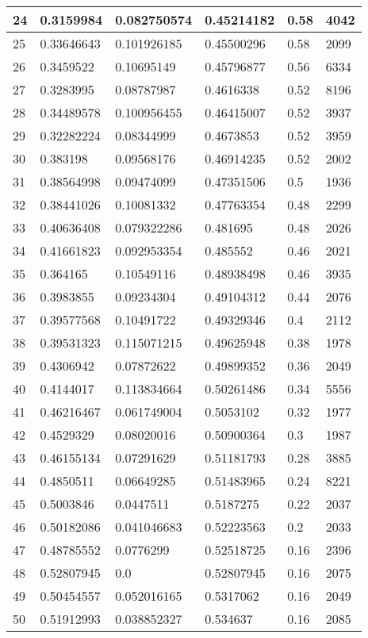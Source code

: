 \begin{longtable}{|l|l|l|l|l|l|}
24 & 0.3159984 & 0.082750574 & 0.45214182 & 0.58 & 4042 \\ \hline 
25 & 0.33646643 & 0.101926185 & 0.45500296 & 0.58 & 2099 \\ \hline 
26 & 0.3459522 & 0.10695149 & 0.45796877 & 0.56 & 6334 \\ \hline 
27 & 0.3283995 & 0.08787987 & 0.4616338 & 0.52 & 8196 \\ \hline 
28 & 0.34489578 & 0.100956455 & 0.46415007 & 0.52 & 3937 \\ \hline 
29 & 0.32282224 & 0.08344999 & 0.4673853 & 0.52 & 3959 \\ \hline 
30 & 0.383198 & 0.09568176 & 0.46914235 & 0.52 & 2002 \\ \hline 
31 & 0.38564998 & 0.09474099 & 0.47351506 & 0.5 & 1936 \\ \hline 
32 & 0.38441026 & 0.10081332 & 0.47763354 & 0.48 & 2299 \\ \hline 
33 & 0.40636408 & 0.079322286 & 0.481695 & 0.48 & 2026 \\ \hline 
34 & 0.41661823 & 0.092953354 & 0.485552 & 0.46 & 2021 \\ \hline 
35 & 0.364165 & 0.10549116 & 0.48938498 & 0.46 & 3935 \\ \hline 
36 & 0.3983855 & 0.09234304 & 0.49104312 & 0.44 & 2076 \\ \hline 
37 & 0.39577568 & 0.10491722 & 0.49329346 & 0.4 & 2112 \\ \hline 
38 & 0.39531323 & 0.115071215 & 0.49625948 & 0.38 & 1978 \\ \hline 
39 & 0.4306942 & 0.07872622 & 0.49899352 & 0.36 & 2049 \\ \hline 
40 & 0.4144017 & 0.113834664 & 0.50261486 & 0.34 & 5556 \\ \hline 
41 & 0.46216467 & 0.061749004 & 0.5053102 & 0.32 & 1977 \\ \hline 
42 & 0.4529329 & 0.08020016 & 0.50900364 & 0.3 & 1987 \\ \hline 
43 & 0.46155134 & 0.07291629 & 0.51181793 & 0.28 & 3885 \\ \hline 
44 & 0.4850511 & 0.06649285 & 0.51483965 & 0.24 & 8221 \\ \hline 
45 & 0.5003846 & 0.0447511 & 0.5187275 & 0.22 & 2037 \\ \hline 
46 & 0.50182086 & 0.041046683 & 0.52223563 & 0.2 & 2033 \\ \hline 
47 & 0.48785552 & 0.0776299 & 0.52518725 & 0.16 & 2396 \\ \hline 
48 & 0.52807945 & 0.0 & 0.52807945 & 0.16 & 2075 \\ \hline 
49 & 0.50454557 & 0.052016165 & 0.5317062 & 0.16 & 2049 \\ \hline 
50 & 0.51912993 & 0.038852327 & 0.534637 & 0.16 & 2085 \\ \hline 
\end{longtable}